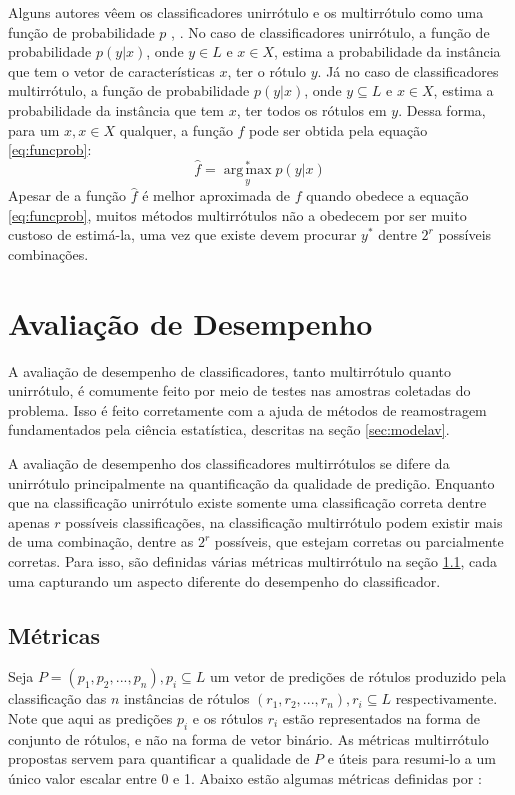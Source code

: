 Alguns autores vêem os classificadores unirrótulo e os multirrótulo como uma função de probabilidade $p$ \cite{mcc2012}, \cite{pcc2010}.
No caso de classificadores unirrótulo, a função de probabilidade $p(y|x)$, onde $y \in L$ e $x \in X$,
estima a probabilidade da instância que tem o vetor de características $x$, ter o rótulo $y$.
Já no caso de classificadores multirrótulo, a função de probabilidade $p(y|x)$, onde $y \subseteq L$ e $x \in X$,
estima a probabilidade da instância que tem $x$, ter todos os rótulos em $y$.
Dessa forma, para um $x,x\in X$ qualquer, a função $\hat{f}$
pode ser obtida pela equação \ref{eq:funcprob}:
\begin{equation} \label{eq:funcprob}
 \hat{f}=\operatorname*{arg\,max}_y^* p(y|x)
\end{equation}
Apesar de a função $\hat{f}$ é melhor aproximada de $f$ quando obedece a equação \ref{eq:funcprob}, 
muitos métodos multirrótulos não a obedecem por ser muito custoso de estimá-la, uma vez que existe
devem procurar $y^*$ dentre $2^r$ possíveis combinações.



\section{Avaliação de Desempenho}
A avaliação de desempenho de classificadores, tanto multirrótulo quanto unirrótulo, é comumente feito
por meio de testes nas amostras coletadas do problema.
Isso é feito corretamente com a ajuda de métodos de reamostragem fundamentados pela ciência estatística,
descritas na seção \ref{sec:modelav}.

A avaliação de desempenho dos classificadores multirrótulos se difere da unirrótulo principalmente na
quantificação da qualidade de predição. Enquanto que na classificação unirrótulo existe somente uma classificação
correta dentre apenas $r$ possíveis classificações, na classificação multirrótulo podem existir mais de uma combinação, 
dentre as $2^r$ possíveis, que estejam corretas ou parcialmente corretas.
Para isso, são definidas várias métricas multirrótulo na seção \ref{sec:metrics},
cada uma capturando um aspecto diferente do desempenho do classificador. 



\subsection{Métricas}
\label{sec:metrics}

Seja $P=(p_1,p_2,...,p_n), p_i \subseteq L$
um vetor de predições de rótulos produzido pela
classificação das $n$ instâncias de rótulos $(r_1,r_2,...,r_n), r_i \subseteq L$
respectivamente. Note que aqui as predições $p_i$ e os rótulos $r_i$ estão representados na forma de conjunto de rótulos,
e não na forma de vetor binário.
As métricas multirrótulo propostas servem para quantificar a qualidade de $P$
e úteis para resumi-lo a um único valor escalar entre 0 e 1.
Abaixo estão algumas métricas definidas por \cite{reviewml2013}:

